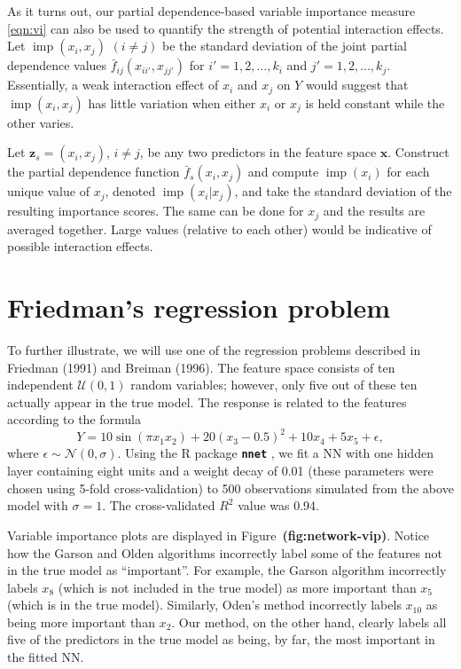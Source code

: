 \documentclass[12pt]{article}
\newcommand{\pkg}[1]{\texorpdfstring%
{{\normalfont\fontseries{b}\selectfont #1}}%
{#1}}
\def\pkg#1{\textbf{\texttt{#1}}}
\def\ref#1{\textbf{(#1)}}
\DeclareMathOperator{\imp}{imp}
\begin{document}
As it turns out, our partial dependence-based variable importance measure \eqref{eqn:vi} can also be used to quantify the strength of potential interaction effects. Let $\imp\left(x_i, x_j\right)$ $\left(i \ne j\right)$ be the standard deviation of the joint partial dependence values $\bar{f}_{ij}\left(x_{ii'}, x_{jj'}\right)$ for $i' = 1, 2, \dots, k_i$ and  $j' = 1, 2, \dots, k_j$. Essentially, a weak interaction effect of $x_i$ and $x_j$ on $Y$ would suggest that $\imp\left(x_i, x_j\right)$ has little variation when either $x_i$ or $x_j$ is held constant while the other varies. 

Let $\boldsymbol{z}_s = \left(x_i, x_j\right)$, $i \neq j$, be any two predictors in the feature space $\boldsymbol{x}$. Construct the partial dependence function $\bar{f}_s\left(x_i, x_j\right)$ and compute $\imp\left(x_i\right)$ for each unique value of $x_j$, denoted $\imp\left(x_i | x_j\right)$, and take the standard deviation of the resulting importance scores. The same can be done for $x_j$ and the results are averaged together. Large values (relative to each other) would be indicative of possible interaction effects. 


\section{Friedman's regression problem}

To further illustrate, we will use one of the regression problems described in Friedman (1991) and Breiman (1996). The feature space consists of ten independent $\mathcal{U}\left(0, 1\right)$ random variables; however, only five out of these ten actually appear in the true model. The response is related to the features according to the formula
\begin{equation*}
Y = 10 \sin\left(\pi x_1 x_2\right) + 20 \left(x_3 - 0.5\right) ^ 2 + 10 x_4 + 5 x_5 + \epsilon,
\end{equation*}
where $\epsilon \sim \mathcal{N}\left(0, \sigma\right)$. Using the R package \pkg{nnet} \citep{venables-modern-2002}, we fit a NN with one hidden layer containing eight units and a weight decay of 0.01 (these parameters were chosen using 5-fold cross-validation) to 500 observations simulated from the above model with $\sigma = 1$. The cross-validated $R^2$ value was 0.94.

Variable importance plots are displayed in Figure~\ref{fig:network-vip}. Notice how the Garson and Olden algorithms incorrectly label some of the features not in the true model as ``important''. For example, the Garson algorithm incorrectly labels $x_8$ (which is not included in the true model) as more important than $x_5$ (which is in the true model). Similarly, Oden's method incorrectly labels $x_{10}$ as being more important than $x_2$. Our method, on the other hand, clearly labels all five of the predictors in the true model as being, by far, the most important in the fitted NN.
\end{document}
